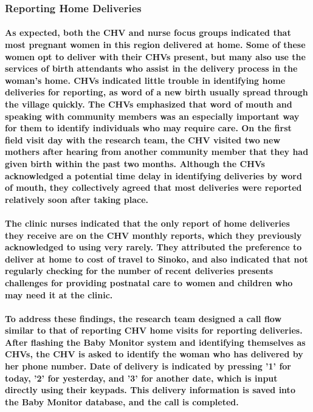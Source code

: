 \subsubsection{Reporting Home Deliveries}
\paragraph{As expected, both the CHV and nurse focus groups indicated that most pregnant women in this region delivered at home. Some of these women opt to deliver with their CHVs present, but many also use the services of birth attendants who assist in the delivery process in the woman's home. CHVs indicated little trouble in identifying home deliveries for reporting, as word of a new birth usually spread through the village quickly. The CHVs emphasized that word of mouth and speaking with community members was an especially important way for them to identify individuals who may require care. On the first field visit day with the research team, the CHV visited two new mothers after hearing from another community member that they had given birth within the past two months. Although the CHVs acknowledged a potential time delay in identifying deliveries by word of mouth, they collectively agreed that most deliveries were reported relatively soon after taking place.} 

\paragraph{The clinic nurses indicated that the only report of home deliveries they receive are on the CHV monthly reports, which they previously acknowledged to using very rarely. They attributed the preference to deliver at home to cost of travel to Sinoko, and also indicated that not regularly checking for the number of recent deliveries presents challenges for providing postnatal care to women and children who may need it at the clinic.}

\paragraph{To address these findings, the research team designed a call flow similar to that of reporting CHV home visits for reporting deliveries. After flashing the Baby Monitor system and identifying themselves as CHVs, the CHV is asked to identify the woman who has delivered by her phone number. Date of delivery is indicated by pressing '1' for today, '2' for yesterday, and '3' for another date, which is input directly using their keypads. This delivery information is saved into the Baby Monitor database, and the call is completed.}

